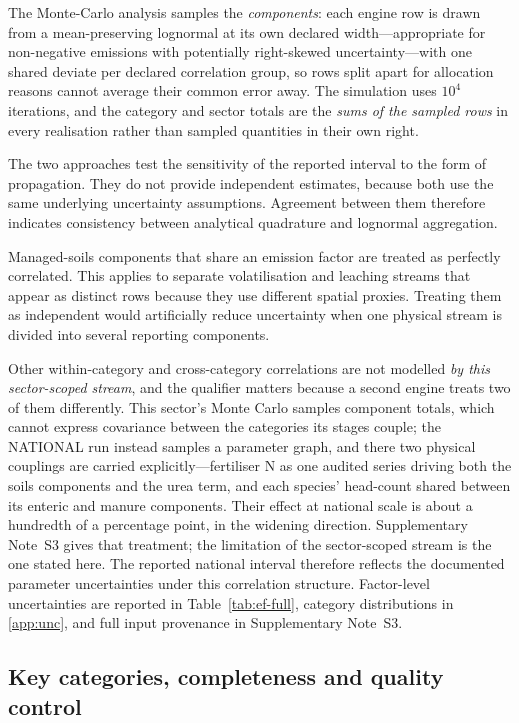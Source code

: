 The Monte-Carlo analysis samples the \emph{components}: each engine row is drawn from a
mean-preserving lognormal at its own declared width---appropriate for non-negative
emissions with potentially right-skewed uncertainty---with one shared deviate per
declared correlation group, so rows split apart for allocation reasons cannot average
their common error away. The simulation uses $10^4$ iterations, and the category and
sector totals are the \emph{sums of the sampled rows} in every realisation rather than
sampled quantities in their own right.

The two approaches test the sensitivity of the reported interval to the form of propagation.
They do not provide independent estimates, because both use the same underlying uncertainty
assumptions. Agreement between them therefore indicates consistency between analytical
quadrature and lognormal aggregation.

Managed-soils components that share an emission factor are treated as perfectly correlated.
This applies to separate volatilisation and leaching streams that appear as distinct rows
because they use different spatial proxies. Treating them as independent would artificially
reduce uncertainty when one physical stream is divided into several reporting components.

Other within-category and cross-category correlations are not modelled \emph{by this
sector-scoped stream}, and the qualifier matters because a second engine treats two of them
differently. This sector's Monte Carlo samples component totals, which cannot express
covariance between the categories its stages couple; the NATIONAL run instead samples a
parameter graph, and there two physical couplings are carried explicitly---fertiliser N as
one audited series driving both the soils components and the urea term, and each species'
head-count shared between its enteric and manure components. Their effect at national scale
is about a hundredth of a percentage point, in the widening direction. Supplementary
Note~S3 gives that treatment; the limitation of the sector-scoped stream is the one stated
here. The reported
national interval therefore reflects the documented parameter uncertainties under this
correlation structure. Factor-level uncertainties are reported in
Table~\ref{tab:ef-full}, category distributions in \ref{app:unc}, and full input
provenance in Supplementary Note~S3.

\subsection{Key categories, completeness and quality control}

